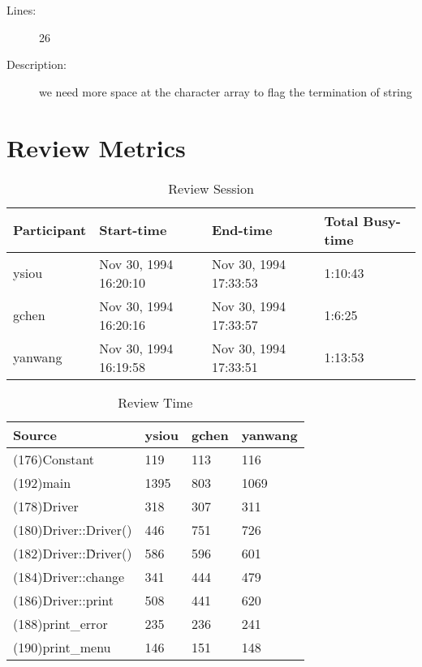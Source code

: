 \begin{enumerate}
\begin{description}
\item [Lines:] 26

\item [Description:] we need more space at the character array to flag the termination of string
\end{description}
\end{enumerate}
\section{Review Metrics}
\begin{table}[hb]
\begin{center}
\begin{tabular}{|l|l|l|l|}
\hline
Participant & Start-time & End-time & Total Busy-time \\
\hline
ysiou & Nov 30, 1994 16:20:10 & Nov 30, 1994 17:33:53 & 1:10:43 \\
gchen & Nov 30, 1994 16:20:16 & Nov 30, 1994 17:33:57 & 1:6:25 \\
yanwang & Nov 30, 1994 16:19:58 & Nov 30, 1994 17:33:51 & 1:13:53 \\
\hline
\end{tabular}
\end{center}
\caption{Review Session}
\end{table}


\begin{table}[hb]
\begin{center}
\begin{tabular}{|l|l|l|l|}
\hline
Source & ysiou & gchen & yanwang\\
\hline
(176)Constant & 119 & 113 & 116\\
(192)main & 1395 & 803 & 1069\\
(178)Driver & 318 & 307 & 311\\
(180)Driver::Driver() & 446 & 751 & 726\\
(182)Driver::\~Driver() & 586 & 596 & 601\\
(184)Driver::change & 341 & 444 & 479\\
(186)Driver::print & 508 & 441 & 620\\
(188)print\_error & 235 & 236 & 241\\
(190)print\_menu & 146 & 151 & 148\\
\hline
\end{tabular}
\end{center}
\caption{Review Time}
\end{table}


